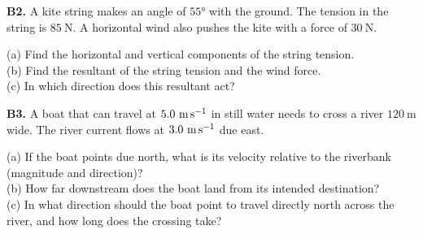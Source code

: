 \begin{exercisebox}[2]
\textbf{B2.} A kite string makes an angle of $55°$ with
the ground. The tension in the string is $85\ \text{N}$.
A horizontal wind also pushes the kite with a force of
$30\ \text{N}$.\\[4pt]
\begin{center}
\end{center}
(a) Find the horizontal and vertical components of the
string tension.\\
(b) Find the resultant of the string tension and the
wind force.\\
(c) In which direction does this resultant act?
\hfill{}

\vspace{0.4cm}

\textbf{B3.} A boat that can travel at $5.0\ \text{m\,s}^{-1}$
in still water needs to cross a river $120\ \text{m}$ wide.
The river current flows at $3.0\ \text{m\,s}^{-1}$ due east.\\[4pt]
\begin{center}
\end{center}
(a) If the boat points due north, what is its velocity
relative to the riverbank (magnitude and direction)?\\
(b) How far downstream does the boat land from its
intended destination?\\
(c) In what direction should the boat point to travel
directly north across the river, and how long does the
crossing take?
\hfill{}


\end{exercisebox}
